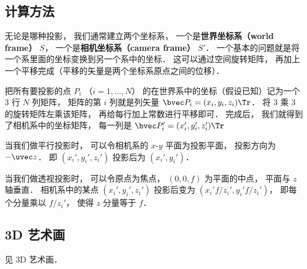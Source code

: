 \subsection{计算方法}
无论是哪种投影， 我们通常建立两个坐标系， 一个是\textbf{世界坐标系（world frame）} $S$， 一个是\textbf{相机坐标系}\textbf{（camera frame）} $S'$． 一个基本的问题就是将一个系里面的坐标变换到另一个系中的坐标． 这可以通过空间旋转矩阵， 再加上一个平移完成（平移的矢量是两个坐标系原点之间的位移）．

把所有要投影的点 $P_i$ （$i = 1, \dots, N$） 的在世界系中的坐标（假设已知）记为一个 3 行 $N$ 列矩阵， 矩阵的第 $i$ 列就是列矢量 $\bvec P_i = (x_i, y_i, z_i)\Tr$． 将 3 乘 3 的旋转矩阵左乘该矩阵， 再给每行加上常数进行平移即可． 完成后， 我们就得到了相机系中的坐标矩阵， 每一列是 $\bvec P_i' = (x_i', y_i', z_i')\Tr$

当我们做平行投影时， 可以令相机系的 $x$-$y$ 平面为投影平面， 投影方向为 $-\uvec z$． 即 $(x_i', y_i', z_i')$ 投影后为 $(x_i', y_i')$．

当我们做透视投影时， 可以令原点为焦点， $(0, 0, f)$ 为平面的中点， 平面与 $z$ 轴垂直． 相机系中的某点 $(x_i', y_i', z_i')$ 投影后变为 $(x_i' f/z_i', y_i' f/z_i')$， 即每个分量乘以 $f/z_i'$， 使得 $z$ 分量等于 $f$．


\subsection{3D 艺术画}
见 3D 艺术画．
